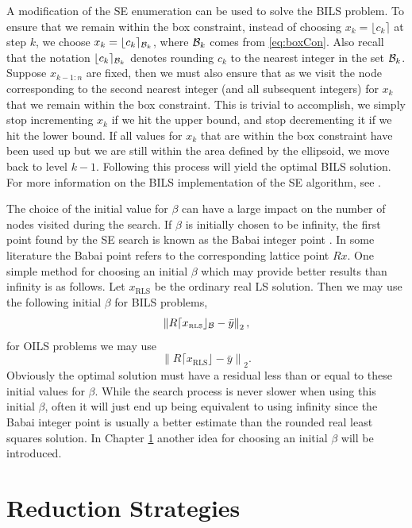 \documentclass[12pt,Bold,letterpaper]{mcgilletdclass}
\begin{document}
A modification of the SE enumeration can be used to solve the BILS problem. To ensure that we remain within the box constraint, instead of choosing $x_k = \lfloor c_k \rceil$ at step $k$, we choose $x_{k} = \lfloor c_{k} \rceil_{{\cal B}_{k}}$, where ${\cal B}_{k}$ comes from \eqref{eq:boxCon}. Also recall that the notation $\lfloor c_{k} \rceil_{{\cal B}_{k}}$ denotes rounding $c_k$ to the nearest integer in the set ${\cal B}_{k}$. Suppose $x_{k-1:n}$ are fixed, then we must also ensure that as we visit the node corresponding to the second nearest integer (and all subsequent integers) for $x_k$ that we remain within the box constraint. This is trivial to accomplish, we simply stop incrementing $x_k$ if we hit the upper bound, and stop decrementing it if we hit the lower bound. If all values for $x_k$ that are within the box constraint have been used up but we are still within the area defined by the ellipsoid, we move back to level $k-1$. Following this process will yield the optimal BILS solution. For more information on the BILS implementation of the SE algorithm, see \cite{ChaH05}.

The choice of the initial value for $\beta$ can have a large impact on the number of nodes visited during the search. If $\beta$ is initially chosen to be infinity, the first point found by the SE search is known as the Babai integer point \cite{Bab86}. In some literature the Babai point refers to the corresponding lattice point $Rx$. One simple method for choosing an initial $\beta$ which may provide better results than infinity is as follows. Let $x_{\scriptscriptstyle{\mathrm{RLS}}}$ be the ordinary real LS solution. Then we may use the following initial $\beta$ for BILS problems,  $$\left \| R \lceil x_{\scriptscriptstyle{\mathrm{RLS}}} \rfloor_{{\cal B}} - \bar{y} \right \|_2,$$ for OILS problems we may use  $$\left \| R \lceil x_{\scriptscriptstyle{\mathrm{RLS}}} \rfloor - \bar{y} \right \|_2.$$ Obviously the optimal solution must have a residual less than or equal to these initial values for $\beta$. While the search process is never slower when using this initial $\beta$, often it will just end up being equivalent to using infinity since the Babai integer point is usually a better estimate than the rounded real least squares solution. In Chapter \ref{chap:Reduction} another idea for choosing an initial $\beta$ will be introduced.

\chapter{Reduction Strategies} \label{chap:Reduction}
\end{document}
